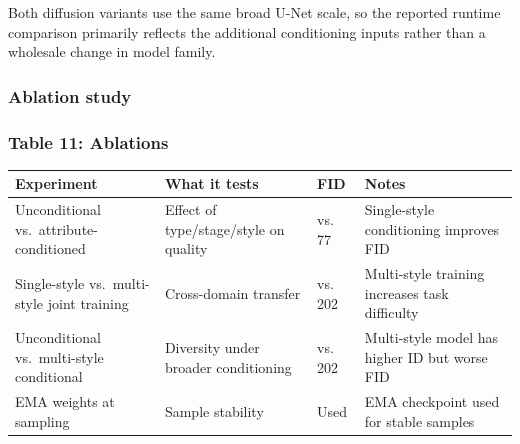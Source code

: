 \documentclass[
]{article}
\begin{document}
Both diffusion variants use the same broad U-Net scale, so the reported
runtime comparison primarily reflects the additional conditioning inputs
rather than a wholesale change in model family.

\subsubsection{Ablation study}\label{ablation-study}

\subsubsection{Table 11: Ablations}\label{table-11.-ablations}

\begin{longtable}[]{@{}
  >{\raggedright\arraybackslash}p{}
  >{\raggedright\arraybackslash}p{}
  >{\raggedright\arraybackslash}p{}
  >{\raggedright\arraybackslash}p{}@{}}
\toprule\noalign{}
\begin{minipage}[b]{\linewidth}\raggedright
Experiment
\end{minipage} & \begin{minipage}[b]{\linewidth}\raggedright
What it tests
\end{minipage} & \begin{minipage}[b]{\linewidth}\raggedright
FID
\end{minipage} & \begin{minipage}[b]{\linewidth}\raggedright
Notes
\end{minipage} \\
\midrule\noalign{}
\endhead
\bottomrule\noalign{}
\endlastfoot
Unconditional vs.~attribute-conditioned & Effect of type/stage/style on
quality & 123 vs. 77 & Single-style conditioning improves FID \\
Single-style vs.~multi-style joint training & Cross-domain transfer &
77 vs. 202 & Multi-style training increases task difficulty \\
Unconditional vs.~multi-style conditional & Diversity under broader
conditioning & 123 vs. 202 & Multi-style model has higher ID but worse FID \\
EMA weights at sampling & Sample stability & Used & EMA checkpoint used for stable samples \\
\end{longtable}
\end{document}
